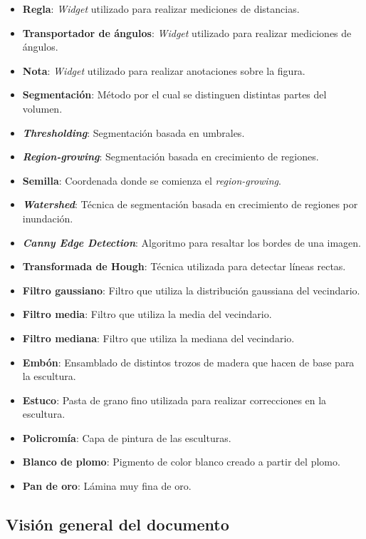 \begin{itemize}
	\item \textbf{Regla}: \textit{Widget} utilizado para realizar mediciones de distancias.
	\item \textbf{Transportador de ángulos}: \textit{Widget} utilizado para realizar mediciones de ángulos.
	\item \textbf{Nota}: \textit{Widget} utilizado para realizar anotaciones sobre la figura.
	\item \textbf{Segmentación}: Método por el cual se distinguen distintas partes del volumen.
	\item \textbf{\textit{Thresholding}}: Segmentación basada en umbrales.
	\item \textbf{\textit{Region-growing}}: Segmentación basada en crecimiento de regiones.
	\item \textbf{Semilla}: Coordenada donde se comienza el \textit{region-growing}.
	\item \textbf{\textit{Watershed}}: Técnica de segmentación basada en crecimiento de regiones por inundación.
	\item \textbf{\textit{Canny Edge Detection}}: Algoritmo para resaltar los bordes de una imagen.
	\item \textbf{Transformada de Hough}: Técnica utilizada para detectar líneas rectas.
	\item \textbf{Filtro gaussiano}: Filtro que utiliza la distribución gaussiana del vecindario.
	\item \textbf{Filtro media}: Filtro que utiliza la media del vecindario.
	\item \textbf{Filtro mediana}: Filtro que utiliza la mediana del vecindario.
	\item \textbf{Embón}: Ensamblado de distintos trozos de madera que hacen de base para la escultura.
	\item \textbf{Estuco}: Pasta de grano fino utilizada para realizar correcciones en la escultura.
	\item \textbf{Policromía}: Capa de pintura de las esculturas.
	\item \textbf{Blanco de plomo}: Pigmento de color blanco creado a partir del plomo.
	\item \textbf{Pan de oro}: Lámina muy fina de oro.
\end{itemize}

\subsection{Visión general del documento}

